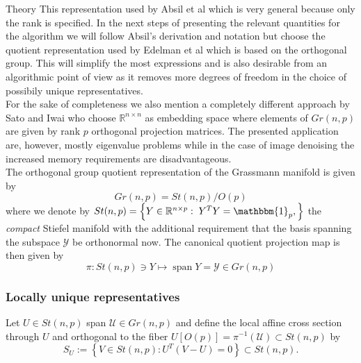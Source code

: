 \begin{chapter}{Theory}
This representation used by Absil et al\cite{AbsilGrassmann} which is very general because only the rank is specified. In the next steps of presenting the relevant quantities for the
algorithm we will follow Absil's derivation and notation but choose the quotient representation used by Edelman et al \cite{EAS} which is based on the orthogonal group. This will simplify the
most expressions and is also desirable from an algorithmic point of view as it removes more degrees of freedom in the choice of possibily unique representatives.\\

For the sake of completeness we also mention a completely different approach by Sato and Iwai \cite{Sato2014} who choose $\mathbb{R}^{n\times n}$ as embedding space
where elements of $Gr(n,p)$ are given by rank $p$ orthogonal projection matrices. The presented application are, however, mostly eigenvalue problems while in the case
of image denoising the increased memory requirements are disadvantageous.\\

The orthogonal group quotient representation of the Grassmann manifold is given by
\begin{equation}
    Gr(n,p) = St(n,p) / O(p) %
\end{equation}
where we denote by $St(n,p)=\left\lbrace Y\in\mathbb{R}^{n\times p}:\; Y^TY=\mathbbm{1}_p,\right\rbrace$ the \emph{compact} Stiefel manifold with the additional
requirement that the basis spanning the subspace $\mathcal{Y}$ be orthonormal now. The canonical quotient projection map is then given by
\begin{equation}
    \pi : St(n,p)\ni Y \mapsto \operatorname{span} Y=\mathcal{Y} \in Gr(n, p)
\end{equation}

\subsubsection{Locally unique representatives} %
\label{ssub:Locally unique Representative}
Let $U\in St(n,p)$ span $\mathcal{U}\in Gr(n,p)$ and define the local affine cross section through $U$ and orthogonal to the fiber $U[O(p)]=\pi^{-1}(\mathcal{U})\subset St(n,p)$ by
\begin{equation}
    S_U := \left\lbrace V\in St(n,p): U^T(V-U)=0 \right\rbrace\subset St(n,p).
\end{equation}


\end{chapter}
